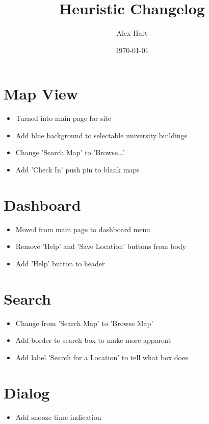 \documentclass{article}
\author{Alex Hart}
\title{Heuristic Changelog}
\date{\today}
\begin{document}
\maketitle

\section{Map View}
\begin{itemize}
\item Turned into main page for site
\item Add blue background to selectable university buildings
\item Change 'Search Map' to 'Browse...'
\item Add 'Check In' push pin to blank maps
\end{itemize}
\section{Dashboard}
\begin{itemize}
\item Moved from main page to dashboard menu
\item Remove 'Help' and 'Save Location' buttons from body
\item Add 'Help' button to header
\end{itemize}
\section{Search}
\begin{itemize}
\item Change from 'Search Map' to 'Browse Map'
\item Add border to search box to make more apparent
\item Add label 'Search for a Location' to tell what box does
\end{itemize}
\section{Dialog}
\begin{itemize}
\item Add snooze time indication
\end{itemize}
\end{document}
